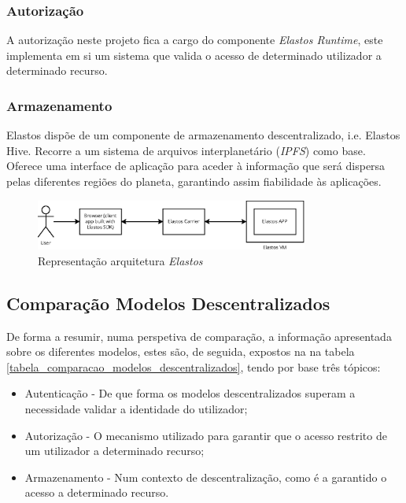 \subsubsection{Autorização}
A autorização neste projeto fica a cargo do componente \emph{Elastos Runtime}, este implementa em si um sistema que valida o acesso de determinado utilizador a determinado recurso\cite{elastos_white_paper}.

\subsubsection{Armazenamento}
Elastos dispõe de um componente de armazenamento descentralizado, i.e. Elastos Hive. Recorre a um sistema de arquivos interplanetário (\emph{IPFS}\label{sym:IPFS}) \cite{ipfs} como base. Oferece uma interface de aplicação para aceder à informação que será dispersa pelas diferentes regiões do planeta, garantindo assim fiabilidade às aplicações.\cite{elastos_white_paper}

\begin{figure}[H]
    \includegraphics[width=0.8\textwidth]{figures/estado_arte-Elastos.eps}
    \caption{Representação arquitetura \emph{Elastos}}
    \label{estado_arte_representacao_elastos}
\end{figure}

\subsection{Comparação Modelos Descentralizados}

De forma a resumir, numa perspetiva de comparação, a informação apresentada sobre os diferentes modelos, estes são, de seguida, expostos na  na tabela \ref{tabela_comparacao_modelos_descentralizados}, tendo por base três tópicos:
\begin{itemize}
    \item Autenticação - De que forma os modelos descentralizados superam a necessidade validar a identidade do utilizador;
    \item Autorização - O mecanismo utilizado para garantir que o acesso restrito de um utilizador a determinado recurso;
    \item Armazenamento - Num contexto de descentralização, como é a garantido o acesso a determinado recurso.
\end{itemize}

